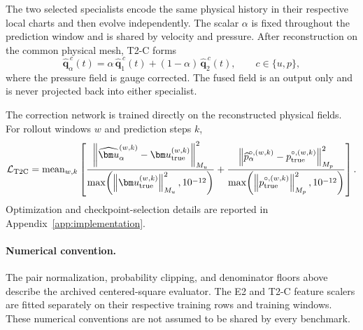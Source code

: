 The two selected specialists encode the same physical history in their
respective local charts and then evolve independently.
The scalar $\alpha$ is fixed throughout the prediction window and is shared
by velocity and pressure.
After reconstruction on the common physical mesh, T2-C forms
\begin{equation}
  \widehat{\bm q}_{\alpha}^{\,c}(t)
  =
  \alpha\,
  \widehat{\bm q}_{1}^{\,c}(t)
  +
  (1-\alpha)\,
  \widehat{\bm q}_{2}^{\,c}(t),
  \qquad
  c\in\{u,p\},
  \label{eq:app_t2c_field_fusion}
\end{equation}
where the pressure field is gauge corrected.
The fused field is an output only and is never projected back into either
specialist.

The correction network is trained directly on the reconstructed physical
fields. For rollout windows $w$ and prediction steps $k$,
\begin{equation}
  \mathcal L_{\rm T2C}
  =
  \operatorname{mean}_{w,k}
  \left[
    \frac{
      \left\|
        \widehat{\bm u}_{\alpha}^{(w,k)}
        -
        \bm u_{\rm true}^{(w,k)}
      \right\|_{M_u}^2
    }{
      \max\!\left(
        \left\|\bm u_{\rm true}^{(w,k)}\right\|_{M_u}^2,10^{-12}
      \right)
    }
    +
    \frac{
      \left\|
        \widehat p_{\alpha}^{\circ,(w,k)}
        -
        p_{\rm true}^{\circ,(w,k)}
      \right\|_{M_p}^2
    }{
      \max\!\left(
        \left\|p_{\rm true}^{\circ,(w,k)}\right\|_{M_p}^2,10^{-12}
      \right)
    }
  \right].
  \label{eq:app_t2c_loss}
\end{equation}
Optimization and checkpoint-selection details are reported in
Appendix~\ref{app:implementation}.

\paragraph{Numerical convention.}
The pair normalization, probability clipping, and denominator floors
above describe the archived centered-square evaluator. The E2 and
T2-C feature scalers are fitted separately on their respective
training rows and training windows. These numerical conventions are
not assumed to be shared by every benchmark.


